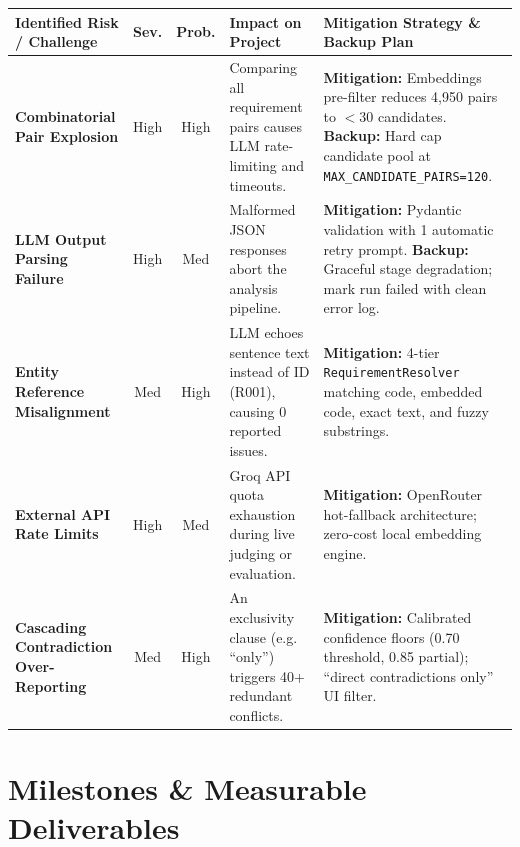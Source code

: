 \documentclass[11pt,a4paper]{article}
\begin{document}
\noindent
\begin{tabularx}{\textwidth}{@{}p{3.2cm} c c p{4.6cm} X@{}}
\toprule
\textbf{Identified Risk / Challenge} & \textbf{Sev.} & \textbf{Prob.} & \textbf{Impact on Project} & \textbf{Mitigation Strategy \& Backup Plan} \\
\midrule
\textbf{Combinatorial Pair Explosion} & High & High & Comparing all requirement pairs causes LLM rate-limiting and timeouts. & \textbf{Mitigation:} Embeddings pre-filter reduces 4,950 pairs to $<30$ candidates. \textbf{Backup:} Hard cap candidate pool at \texttt{MAX\_CANDIDATE\_PAIRS=120}. \\
\addlinespace[2pt]
\textbf{LLM Output Parsing Failure} & High & Med & Malformed JSON responses abort the analysis pipeline. & \textbf{Mitigation:} Pydantic validation with 1 automatic retry prompt. \textbf{Backup:} Graceful stage degradation; mark run failed with clean error log. \\
\addlinespace[2pt]
\textbf{Entity Reference Misalignment} & Med & High & LLM echoes sentence text instead of ID (R001), causing 0 reported issues. & \textbf{Mitigation:} 4-tier \texttt{RequirementResolver} matching code, embedded code, exact text, and fuzzy substrings. \\
\addlinespace[2pt]
\textbf{External API Rate Limits} & High & Med & Groq API quota exhaustion during live judging or evaluation. & \textbf{Mitigation:} OpenRouter hot-fallback architecture; zero-cost local embedding engine. \\
\addlinespace[2pt]
\textbf{Cascading Contradiction Over-Reporting} & Med & High & An exclusivity clause (e.g. ``only'') triggers 40+ redundant conflicts. & \textbf{Mitigation:} Calibrated confidence floors (0.70 threshold, 0.85 partial); ``direct contradictions only'' UI filter. \\
\bottomrule
\end{tabularx}

\section{Milestones \& Measurable Deliverables}
\end{document}
